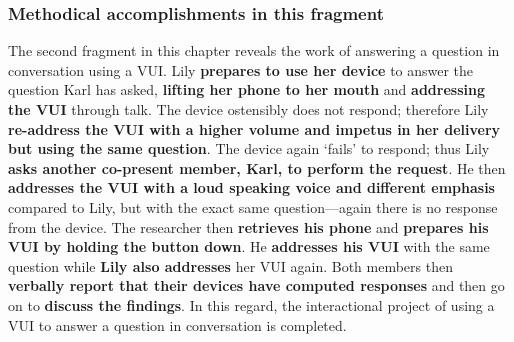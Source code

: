 





\subsubsection{Methodical accomplishments in this fragment}\label{sec:empirical cafe findings answering methods}
\begin{revisedsubmission}
The second fragment in this chapter reveals the work of answering a question in conversation using a \ac{VUI}.
Lily \textbf{prepares to use her device} to answer the question Karl has asked, \textbf{lifting her phone to her mouth} and \textbf{addressing the \ac{VUI}} through talk.
The device ostensibly does not respond; therefore Lily \textbf{re-address the \ac{VUI} with a higher volume and impetus in her delivery but using the same question}.
The device again `fails' to respond; thus Lily \textbf{asks another co-present member, Karl, to perform the request}.
He then \textbf{addresses the \ac{VUI} with a loud speaking voice and different emphasis} compared to Lily, but with the exact same question---again there is no response from the device.
The researcher then \textbf{retrieves his phone} and \textbf{prepares his \ac{VUI} by holding the button down}.
He \textbf{addresses his \ac{VUI}} with the same question while \textbf{Lily also addresses} her \ac{VUI} again.
Both members then \textbf{verbally report that their devices have computed responses} and then go on to \textbf{discuss the findings}.
In this regard, the interactional project of using a \ac{VUI} to answer a question in conversation is completed.
\end{revisedsubmission}






